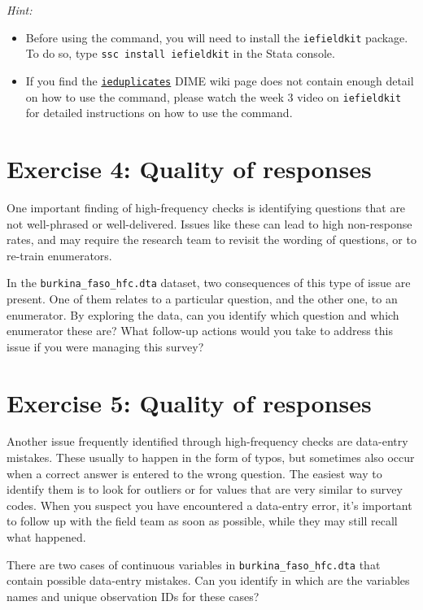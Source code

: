 \documentclass{tufte-handout}
\begin{document}
\vspace{.5cm}
\noindent
\textit{Hint:}
\begin{itemize}
	\item Before using the command, you will need to install the \texttt{iefieldkit} package. To do so, type \texttt{ssc install iefieldkit} in the Stata console.
	\item If you find the \textcolor{blue}{\href{https://dimewiki.worldbank.org/wiki/Ieduplicates}{\texttt{ieduplicates}}} DIME wiki page does not contain enough detail on how to use the command, please watch the week 3 video on \texttt{iefieldkit} for detailed instructions on how to use the command.
\end{itemize}

\section{Exercise 4: Quality of responses}

One important finding of high-frequency checks is identifying questions that are not well-phrased or well-delivered. Issues like these can lead to high non-response rates, and may require the research team to revisit the wording of questions, or to re-train enumerators. 

In the \texttt{burkina\_faso\_hfc.dta} dataset, two consequences of this type of issue are present. One of them relates to a particular question, and the other one, to an enumerator. By exploring the data, can you identify which question and which enumerator these are? What follow-up actions would you take to address this issue if you were managing this survey?

\section{Exercise 5: Quality of responses}

Another issue frequently identified through high-frequency checks are data-entry mistakes. These usually to happen in the form of typos, but sometimes also occur when a correct answer is entered to the wrong question. The easiest way to identify them is to look for outliers or for values that are very similar to survey codes. When you suspect you have encountered a data-entry error, it's important to follow up with the field team as soon as possible, while they may still recall what happened.

There are two cases of continuous variables in \texttt{burkina\_faso\_hfc.dta} that contain possible data-entry mistakes. Can you identify in which are the variables names and unique observation IDs for these cases?
\end{document}
